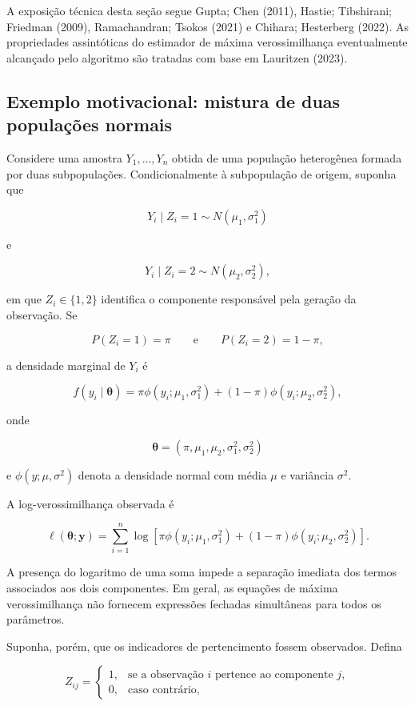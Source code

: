 \documentclass[
  letterpaper,
  DIV=11,
  numbers=noendperiod]{scrreprt}
\begin{document}
A exposição técnica desta seção segue Gupta; Chen (2011), Hastie;
Tibshirani; Friedman (2009), Ramachandran; Tsokos (2021) e Chihara;
Hesterberg (2022). As propriedades assintóticas do estimador de máxima
verossimilhança eventualmente alcançado pelo algoritmo são tratadas com
base em Lauritzen (2023).

\subsection{Exemplo motivacional: mistura de duas populações
normais}\label{exemplo-motivacional-mistura-de-duas-populauxe7uxf5es-normais}

Considere uma amostra \(Y_1,\ldots,Y_n\) obtida de uma população
heterogênea formada por duas subpopulações. Condicionalmente à
subpopulação de origem, suponha que

\[Y_i\mid Z_i=1\sim N(\mu_1,\sigma_1^2)\]

e

\[Y_i\mid Z_i=2\sim N(\mu_2,\sigma_2^2),\]

em que \(Z_i\in\{1,2\}\) identifica o componente responsável pela
geração da observação. Se

\[P(Z_i=1)=\pi
\qquad\text{e}\qquad
P(Z_i=2)=1-\pi,\]

a densidade marginal de \(Y_i\) é

\[f(y_i\mid\boldsymbol{\theta})
=
\pi\phi(y_i;\mu_1,\sigma_1^2)
+
(1-\pi)\phi(y_i;\mu_2,\sigma_2^2),\]

onde

\[\boldsymbol{\theta}
=
(\pi,\mu_1,\mu_2,\sigma_1^2,\sigma_2^2)\]

e \(\phi(y;\mu,\sigma^2)\) denota a densidade normal com média \(\mu\) e
variância \(\sigma^2\).

A log-verossimilhança observada é

\[\ell(\boldsymbol{\theta};\boldsymbol{y})
=
\sum_{i=1}^n
\log\left[
\pi\phi(y_i;\mu_1,\sigma_1^2)
+
(1-\pi)\phi(y_i;\mu_2,\sigma_2^2)
\right].\]

A presença do logaritmo de uma soma impede a separação imediata dos
termos associados aos dois componentes. Em geral, as equações de máxima
verossimilhança não fornecem expressões fechadas simultâneas para todos
os parâmetros.

Suponha, porém, que os indicadores de pertencimento fossem observados.
Defina

\[Z_{ij}
=
\begin{cases}
1, & \text{se a observação }i\text{ pertence ao componente }j,\\
0, & \text{caso contrário},
\end{cases}\]
\end{document}
